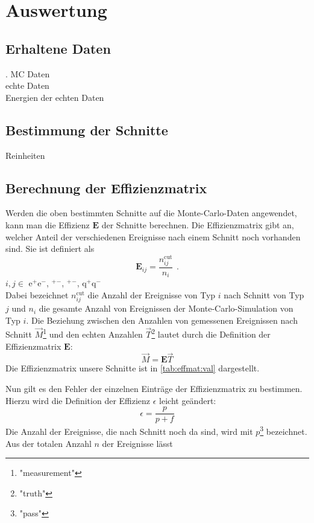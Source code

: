 \section{Auswertung}
\subsection{Erhaltene Daten}.
MC Daten \\
echte Daten \\
Energien der echten Daten


\subsection{Bestimmung der Schnitte}
Reinheiten
\subsection{Berechnung der Effizienzmatrix}
Werden die oben bestimmten Schnitte auf die Monte-Carlo-Daten angewendet, kann man die Effizienz $\bm{E}$ der Schnitte berechnen. 
Die Effizienzmatrix gibt an, welcher Anteil der verschiedenen Ereignisse nach einem Schnitt noch vorhanden sind. Sie ist definiert als 
\begin{equation}
    \bm{E}_{ij} = \frac{n_{ij}^\text{cut}}{n_i} \ \, .
\end{equation} 
$i, j \in $ e$^+$e$^-$, \textmu$^+$\textmu$^-$, \texttau$^+$\texttau$^-$, q$^+$q$^-$ \\  %
Dabei bezeichnet $n_{ij}^\text{cut}$ die Anzahl der Ereignisse von Typ $i$ nach Schnitt von Typ $j$ und $n_i$ die gesamte Anzahl von Ereignissen 
der Monte-Carlo-Simulation von Typ $i$. 
Die Beziehung zwischen den Anzahlen von gemessenen Ereignissen nach Schnitt $\vec{M}$\footnote{"measurement"} und den echten Anzahlen 
$\vec{T}$\footnote{"truth"} lautet durch die Definition der Effizienzmatrix $\bm{E}$:
\begin{equation}
    \label{eq:effmat:mtrel}
    \vec{M} = \bm{E} \vec{T}
\end{equation}
Die Effizienzmatrix unsere Schnitte ist in \autoref{tab:effmat:val} dargestellt.

Nun gilt es den Fehler der einzelnen Einträge der Effizienzmatrix zu bestimmen. Hierzu wird die Definition der Effizienz $\epsilon$ leicht geändert:
\begin{equation}
    \epsilon = \frac{p}{p+f}	
\end{equation}
Die Anzahl der Ereignisse, die nach Schnitt noch da sind, wird mit $p$\footnote{"pass"} bezeichnet. Aus der totalen Anzahl $n$ der Ereignisse lässt 
